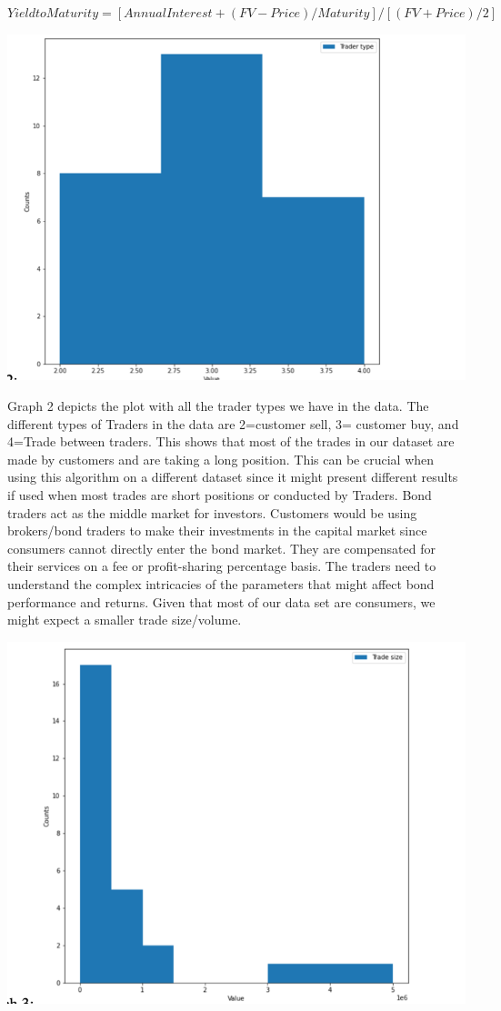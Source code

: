 \documentclass[
  man]{apa6}
\begin{document}
\par

\(Yield to Maturity = [Annual Interest + {(FV-Price)/Maturity}] / [(FV+Price)/2]\)

\includegraphics{graph2.png}

Graph 2 depicts the plot with all the trader types we have in the data. The different types of Traders in the data are 2=customer sell, 3= customer buy, and 4=Trade between traders. This shows that most of the trades in our dataset are made by customers and are taking a long position. This can be crucial when using this algorithm on a different dataset since it might present different results if used when most trades are short positions or conducted by Traders. Bond traders act as the middle market for investors. Customers would be using brokers/bond traders to make their investments in the capital market since consumers cannot directly enter the bond market. They are compensated for their services on a fee or profit-sharing percentage basis. The traders need to understand the complex intricacies of the parameters that might affect bond performance and returns. Given that most of our data set are consumers, we might expect a smaller trade size/volume.

\par

\includegraphics{graph3.png}
\end{document}
